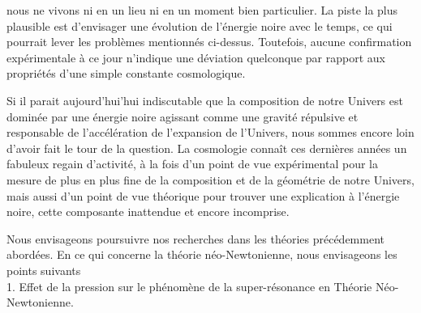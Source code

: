 \documentclass[a4paper,12pt]{report}
\theoremstyle{plain}
\theoremstyle{plain}
\begin{document}
nous ne vivons ni en un lieu ni en un moment bien particulier.
	La piste la plus plausible est d’envisager une évolution de l’énergie noire avec le temps,
	ce qui pourrait lever les problèmes mentionnés ci-dessus. Toutefois, aucune confirmation
	expérimentale à ce jour n’indique une déviation quelconque par rapport aux propriétés
	d’une simple constante cosmologique. 


Si il parait aujourd'hui’hui indiscutable que la composition de notre Univers est dominée
	par une énergie noire agissant comme une gravité répulsive et responsable de l’accélération
	de l’expansion de l’Univers, nous sommes encore loin d’avoir fait le tour de la question.
	La cosmologie connaît ces dernières années un fabuleux regain d’activité, à la fois d’un
	point de vue expérimental pour la mesure de plus en plus fine de la composition et de
	la géométrie de notre Univers, mais aussi d’un point de vue théorique pour trouver une
	explication à l’énergie noire, cette composante inattendue et encore incomprise.






Nous envisageons poursuivre nos recherches dans les théories précédemment abordées.
	En ce qui concerne la théorie néo-Newtonienne, nous envisageons les points suivants \\
1. Effet de la pression sur le phénomène de la super-résonance en Théorie Néo-Newtonienne.\\
\end{document}
